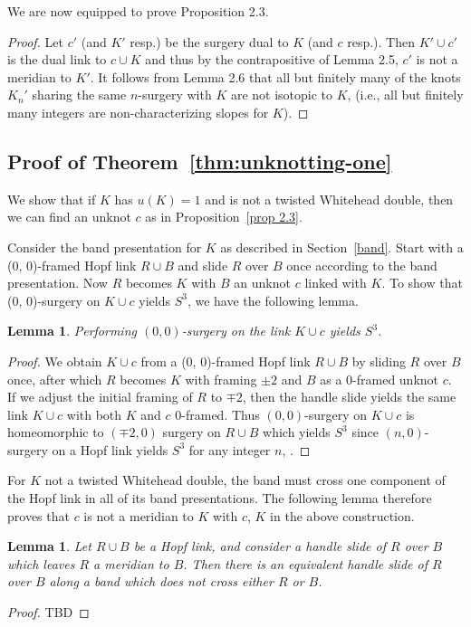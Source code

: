 \documentclass[11pt,usenames,dvipsnames,reqno]{amsart}
\numberwithin{theorem}{section}
\newtheorem{lemma}[theorem]{Lemma}
\theoremstyle{ex}
\theoremstyle{rem}
\begin{document}
We are now equipped to prove Proposition 2.3. 

\begin{proof}
Let $c'$ (and $K'$ resp.) be the surgery dual to $K$ (and $c$ resp.). Then $K' \cup c'$ is the dual link to $c \cup K$ and thus by the contrapositive of Lemma 2.5, $c'$ is not a meridian to $K'$. It follows from Lemma 2.6 that all but finitely many of the knots $K_n'$ sharing the same $n$-surgery with $K$ are not isotopic to $K$, (i.e., all but finitely many integers are non-characterizing slopes for $K$).
\end{proof}


\subsection{Proof of Theorem~\ref{thm:unknotting-one}} We show that if $K$ has $u(K)=1$ and is not a twisted Whitehead double, then we can find an unknot $c$ as in Proposition~\ref{prop 2.3}. 

Consider the band presentation for $K$ as described in Section~\ref{band}. Start with a (0, 0)-framed Hopf link $R\cup B$ and slide $R$ over $B$ once according to the band presentation. Now $R$ becomes $K$ with $B$ an unknot $c$ linked with $K$. To show that (0, 0)-surgery on $K\cup c$ yields $S^3$, we have the following lemma. 

\begin{lemma}
	Performing $(0,0)$-surgery on the link $K\cup c$ yields $S^3$.
\end{lemma}

\begin{proof}
	We obtain $K\cup c$ from a (0, 0)-framed Hopf link $R \cup B$ by sliding $R$ over $B$ once, after which $R$ becomes $K$ with framing $\pm 2$ and $B$ as a 0-framed unknot $c$. If we adjust the initial framing of $R$ to $\mp 2$, then the handle slide yields the same link $K\cup c$ with both $K$ and $c$ 0-framed. Thus $(0,0)$-surgery on $K\cup c$ is homeomorphic to $(\mp 2,0)$ surgery on $R\cup B$ which yields $S^3$ since $(n,0)$-surgery on a Hopf link yields $S^3$ for any integer $n$, .
\end{proof}

For $K$ not a twisted Whitehead double, the band must cross one component of the Hopf link in all of its band presentations. The following lemma therefore proves that $c$ is not a meridian to $K$ with $c$, $K$ in the above construction.

\begin{lemma}
	Let $R\cup B$ be a Hopf link, and consider a handle slide of $R$ over $B$ which leaves $R$ a meridian to $B$. Then there is an equivalent handle slide of $R$ over $B$ along a band which does not cross either $R$ or $B$.
\end{lemma}
\begin{proof}
	TBD
\end{proof}
\end{document}

